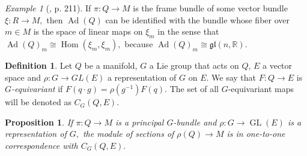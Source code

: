 \documentclass[12pt, letterpaper, reqno]{amsart}
\theoremstyle{definition}
\newtheorem{df}{Definition}
\theoremstyle{plain}
\newtheorem{prop}{Proposition}
\theoremstyle{remark}
\newtheorem{ex}{Example}
\begin{document}
\begin{ex}[\cite{montgomery2002tour}, p. 211]
	If $ \pi:Q \rightarrow M $ is the frame bundle of some vector bundle $ \xi: R \rightarrow M, $ then $ \operatorname{Ad}(Q) $ can be identified with the bundle whose fiber over $ m\in M $ is the space of linear maps on $ \xi_m $ in the sense that $ \operatorname{Ad} (Q)_m \cong \operatorname{Hom}(\xi_m,\xi_m),  $ because $ \operatorname{Ad}(Q)_m\cong \mathfrak{gl}(n, \mathbb{R}).  $ 
\end{ex}
\begin{df}\label{df:equivariant}
	Let $ Q $ be a manifold, $ G $ a Lie group that acts on $ Q $, $ E $ a vector space and $ \rho: G \rightarrow GL(E) $ a representation of $ G $ on $ E $. We say that $ F: Q \rightarrow E $ is \textit{$G$-equivariant} if $ F(q\cdot g) = \rho(g^{-1})F(q). $ The set of all $ G $-equivariant maps will be denoted as $ C_G(Q,E). $  
\end{df}
\begin{prop}
	
If $ \pi: Q \rightarrow M $ is a principal $ G $-bundle and $ \rho: G \rightarrow \operatorname{GL} (E) $ is a representation  of $ G, $ the module of sections of $ \rho(Q) \rightarrow M $ is in one-to-one correspondence with $ C_G(Q,E). $
\end{prop}
\end{document}
